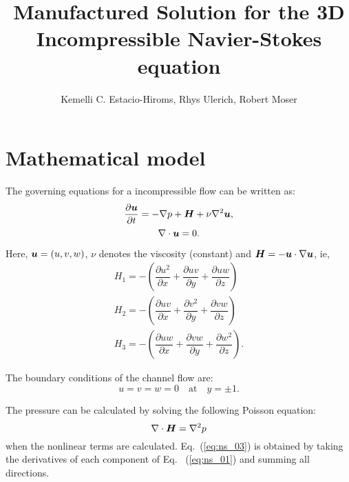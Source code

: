 \documentclass[10pt]{article}
\title{Manufactured Solution for the 3D Incompressible Navier-Stokes equation}
\author{Kemelli C. Estacio-Hiroms, Rhys Ulerich, Robert Moser}
\newcommand{\diff}[2] {\dfrac{\partial #1}{\partial #2}}
\newcommand{\bv}[1]{\ensuremath{\mbox{\boldmath$ #1 $}}}
\begin{document}
	
\maketitle
% 





\section{Mathematical model}
The governing equations for a incompressible flow can be written as:%
\begin{equation}
 \label{eq:ns_01}
\diff{\bv{u}}{t}  = -\nabla p +\bv{H} +  \nu \nabla^2 \bv{u},
\end{equation}
\begin{equation}
 \label{eq:ns_02}
\nabla \cdot \bv{u} = 0.
\end{equation}




Here, $\bv{u}=(u,v,w)$,  $\nu$ denotes the viscosity (constant) and $\bv{H}=-\bv{u}\cdot\nabla\bv{u}$, ie,
\begin{eqnarray}
 H_1 = - \left(\diff{ u^2}{x}+\diff{ uv }{y} +\diff{ uw}{z} \right)\\
 H_2 = - \left(\diff{ uv }{x}+\diff{ v^2}{y} +\diff{ vw}{z} \right)\\
 H_3 = - \left(\diff{ uw }{x}+\diff{ vw }{y} +\diff{ w^2}{z} \right).
\end{eqnarray}

The boundary conditions of the channel flow are:
$$u=v=w =0 \quad \mbox{at} \quad y=\pm 1.$$

The pressure can be calculated by solving the following Poisson equation:
\begin{equation}
\label{eq:ns_03}
\nabla \cdot \bv{H} = \nabla^2 p 
\end{equation}
when the nonlinear terms are calculated. Eq.~(\ref{eq:ns_03}) is obtained by taking the derivatives of each component of Eq.~ (\ref{eq:ns_01}) and summing all directions.
\end{document}
